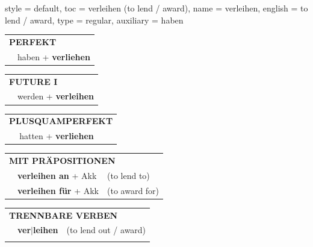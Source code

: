 \begin{verbentry}{
  style = {default},
  toc = {verleihen (to lend / award)},
  name = {verleihen},
  english = {to lend / award},
  type = {regular},
  auxiliary = {haben}
}
 \begin{tabular}{rl}
     \multicolumn{2}{l}{\textbf{PERFEKT}}\\
   & haben + \textbf{verliehen}\\
  \end{tabular}
\hfill
\begin{tabular}{rl}
    \multicolumn{2}{l}{\textbf{FUTURE I}}\\
   & werden + \textbf{verleihen}\\
  \end{tabular}
\hfill
\begin{tabular}{rl}
    \multicolumn{2}{l}{\textbf{PLUSQUAMPERFEKT}}\\
   & hatten + \textbf{verliehen}\\
  \end{tabular}

 \vspace{10pt}

\begin{tabular}{lll}
      \multicolumn{3}{l}{\textbf{MIT PRÄPOSITIONEN}}\\
& \textbf{verleihen an} + Akk & (to lend to)\\
& \textbf{verleihen für} + Akk & (to award for)\\
\end{tabular}
  \hfill
\begin{tabular}{lll}
      \multicolumn{3}{l}{\textbf{TRENNBARE VERBEN}}\\
 & \textbf{ver$|$leihen} & (to lend out / award)\\
\vspace{10pt}
  \end{tabular}


\vspace{-5pt}
\end{verbentry}

